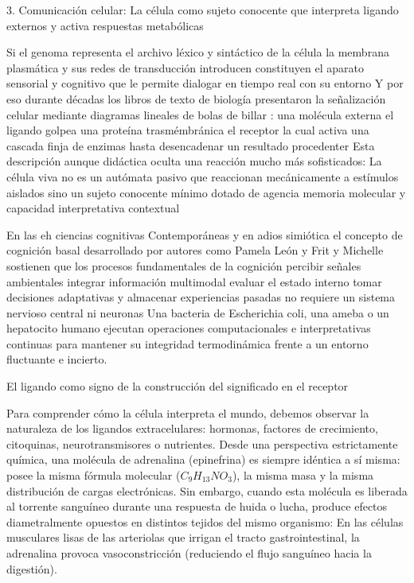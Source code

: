 3. Comunicación celular:  La célula como sujeto conocente que interpreta ligando externos y activa respuestas metabólicas

Si el genoma representa el archivo léxico y sintáctico de la célula la membrana plasmática y sus redes de transducción introducen constituyen el aparato sensorial y cognitivo que le permite dialogar en tiempo real con su entorno
Y por eso durante décadas los libros de texto de biología presentaron la señalización celular mediante diagramas lineales de bolas de billar : una molécula externa el ligando golpea una proteína trasmémbránica el receptor la cual activa una cascada finja de enzimas hasta desencadenar un resultado procedenter
Esta descripción aunque didáctica oculta una reacción mucho más sofisticados: La célula viva no es un autómata pasivo que reaccionan mecánicamente a estímulos aislados sino un sujeto conocente mínimo dotado de agencia memoria molecular y capacidad interpretativa contextual

En las eh ciencias cognitivas Contemporáneas y en adios simiótica el concepto de cognición basal desarrollado por autores como Pamela León y Frit y Michelle sostienen que los procesos fundamentales de la cognición percibir señales ambientales integrar información multimodal evaluar el estado interno tomar decisiones adaptativas y almacenar experiencias pasadas no requiere un sistema nervioso central ni neuronas
Una bacteria de Escherichia coli, una ameba o un hepatocito humano ejecutan operaciones computacionales e interpretativas continuas para mantener su integridad termodinámica frente a un entorno fluctuante e incierto.

El ligando como signo de la construcción del significado en el receptor 

Para comprender cómo la célula interpreta el mundo, debemos observar la naturaleza de los ligandos extracelulares: hormonas, factores de crecimiento, citoquinas, neurotransmisores o nutrientes.
Desde una perspectiva estrictamente química, una molécula de adrenalina (epinefrina) es siempre idéntica a sí misma: posee la misma fórmula molecular ($C_9H_{13}NO_3$), la misma masa y la misma distribución de cargas electrónicas. 
Sin embargo, cuando esta molécula es liberada al torrente sanguíneo durante una respuesta de huida o lucha, produce efectos diametralmente opuestos en distintos tejidos del mismo organismo:
En las células musculares lisas de las arteriolas que irrigan el tracto gastrointestinal, la adrenalina provoca vasoconstricción (reduciendo el flujo sanguíneo hacia la digestión).

